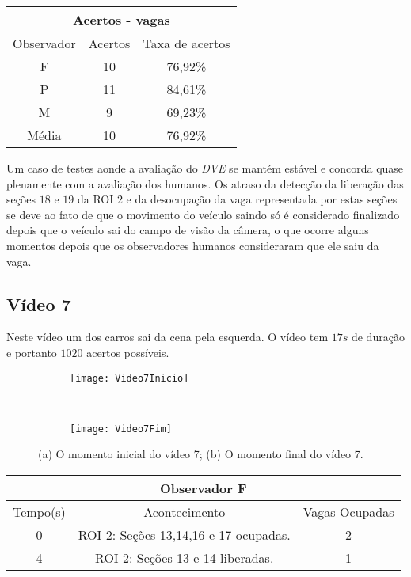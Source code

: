 \begin{center}
\begin{tabular}{|c||c||c|}
\hline
\multicolumn{3}{|c|}{Acertos - vagas}  \\ \hline \hline
Observador & Acertos & Taxa de acertos \\ \hline
F & 10 & 76,92\% \\  \hline
P & 11 & 84,61\% \\ \hline
M & 9 & 69,23\% \\ \hline
Média & 10 & 76,92\% \\
\hline
\end{tabular}
\end{center}


Um caso de testes aonde a avaliação do \textit{DVE} se mantém estável e concorda quase plenamente com a avaliação dos humanos. Os atraso da detecção da liberação das seções $18$ e $19$ da ROI $2$ e da desocupação da vaga representada por estas seções se deve ao fato de que o movimento do veículo saindo só é considerado finalizado depois que o veículo sai do campo de visão da câmera, o que ocorre alguns momentos depois que os observadores humanos consideraram que ele saiu da vaga.

\subsection{Vídeo 7}

Neste vídeo um dos carros sai da cena pela esquerda. O vídeo tem $17s$ de duração e portanto $1020$ acertos possíveis.

\begin{figure}[!h]
\centering
\begin{subfigure}{.5\textwidth}
\centering
\texttt{[image: Video7Inicio]}
\caption{}
\end{subfigure}\
\begin{subfigure}{.5\textwidth}
\centering
\texttt{[image: Video7Fim]}
\caption{}
\end{subfigure}
\centering
\caption{(a) O momento inicial do vídeo 7; (b) O momento final do vídeo 7.}%
\label{}%
\end{figure}

\begin{center}
\begin{tabular}{|c||c||c|}
\hline
\multicolumn{3}{|c|}{Observador F}  \\ \hline \hline
Tempo(s) & Acontecimento & Vagas Ocupadas \\ \hline
0 & ROI 2: Seções 13,14,16 e 17 ocupadas. & 2 \\ \hline
4 & ROI 2: Seções 13 e 14 liberadas. & 1 \\
\hline
\end{tabular}
\end{center}

